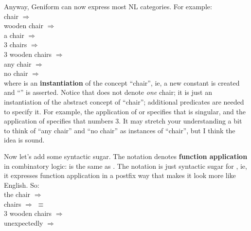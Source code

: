 Anyway, Geniform can now express most NL categories.  For example:\\
\hspace*{1cm} chair $\Longrightarrow$ \\
\hspace*{1cm} wooden chair $\Longrightarrow$ \\
\hspace*{1cm} a chair $\Longrightarrow$ \\
\hspace*{1cm} 3 chairs $\Longrightarrow$ \\
\hspace*{1cm} 3 wooden chairs $\Longrightarrow$ \\
\hspace*{1cm} any chair $\Longrightarrow$ \\
\hspace*{1cm} no chair $\Longrightarrow$ \\
where  is an \textbf{instantiation} of the concept ``chair'', ie, a new constant  is created and ``'' is asserted.  Notice that  does not denote \textit{one} chair; it is just an instantiation of the abstract concept of ``chair''; additional predicates are needed to specify it.  For example, the application of  or  specifies that  is singular, and the application of  specifies that  numbers 3.  It may stretch your understanding a bit to think of ``any chair'' and ``no chair'' as instances of ``chair'', but I think the idea is sound.

Now let's add some syntactic sugar.  The notation  denotes \textbf{function application} in combinatory logic:   is the same as .  The notation  is just syntactic sugar for , ie, it expresses function application in a postfix way that makes it look more like English.  So:\\
\hspace*{1cm} the chair $\Longrightarrow$ \\
\hspace*{1cm} chairs $\Longrightarrow$  $\equiv$ \\
\hspace*{1cm} 3 wooden chairs $\Longrightarrow$ \\
\hspace*{1cm} unexpectedly $\Longrightarrow$ 

